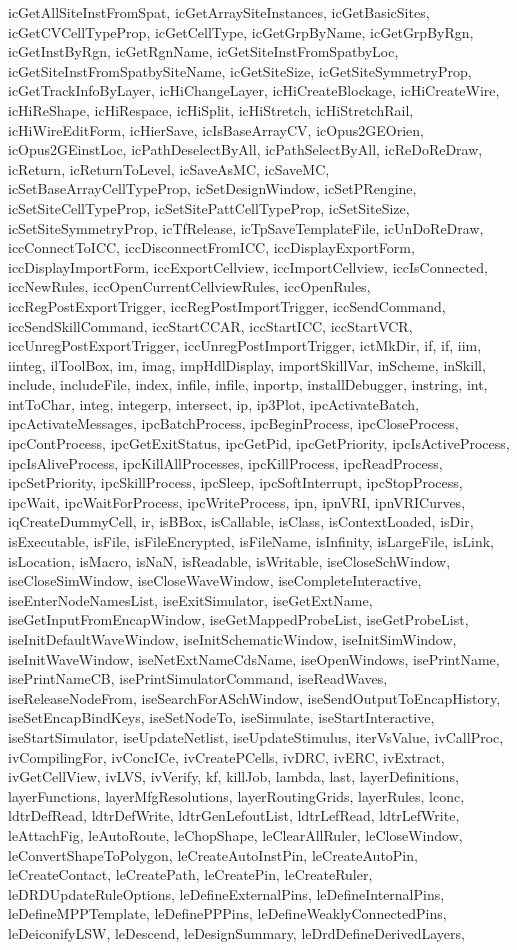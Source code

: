 {{icGetAllSiteInstFromSpat, icGetArraySiteInstances, icGetBasicSites, icGetCVCellTypeProp, icGetCellType, icGetGrpByName, icGetGrpByRgn, icGetInstByRgn, icGetRgnName, icGetSiteInstFromSpatbyLoc, icGetSiteInstFromSpatbySiteName, icGetSiteSize, icGetSiteSymmetryProp, icGetTrackInfoByLayer, icHiChangeLayer, icHiCreateBlockage, icHiCreateWire, icHiReShape, icHiRespace, icHiSplit, icHiStretch, icHiStretchRail, icHiWireEditForm, icHierSave, icIsBaseArrayCV, icOpus2GEOrien, icOpus2GEinstLoc, icPathDeselectByAll, icPathSelectByAll, icReDoReDraw, icReturn, icReturnToLevel, icSaveAsMC, icSaveMC, icSetBaseArrayCellTypeProp, icSetDesignWindow, icSetPRengine, icSetSiteCellTypeProp, icSetSitePattCellTypeProp, icSetSiteSize, icSetSiteSymmetryProp, icTfRelease, icTpSaveTemplateFile, icUnDoReDraw, iccConnectToICC, iccDisconnectFromICC, iccDisplayExportForm, iccDisplayImportForm, iccExportCellview, iccImportCellview, iccIsConnected, iccNewRules, iccOpenCurrentCellviewRules, iccOpenRules, iccRegPostExportTrigger, iccRegPostImportTrigger, iccSendCommand, iccSendSkillCommand, iccStartCCAR, iccStartICC, iccStartVCR, iccUnregPostExportTrigger, iccUnregPostImportTrigger, ictMkDir, if, if, iim, iinteg, ilToolBox, im, imag, impHdlDisplay, importSkillVar, inScheme, inSkill, include, includeFile, index, infile, infile, inportp, installDebugger, instring, int, intToChar, integ, integerp, intersect, ip, ip3Plot, ipcActivateBatch, ipcActivateMessages, ipcBatchProcess, ipcBeginProcess, ipcCloseProcess, ipcContProcess, ipcGetExitStatus, ipcGetPid, ipcGetPriority, ipcIsActiveProcess, ipcIsAliveProcess, ipcKillAllProcesses, ipcKillProcess, ipcReadProcess, ipcSetPriority, ipcSkillProcess, ipcSleep, ipcSoftInterrupt, ipcStopProcess, ipcWait, ipcWaitForProcess, ipcWriteProcess, ipn, ipnVRI, ipnVRICurves, iqCreateDummyCell, ir, isBBox, isCallable, isClass, isContextLoaded, isDir, isExecutable, isFile, isFileEncrypted, isFileName, isInfinity, isLargeFile, isLink, isLocation, isMacro, isNaN, isReadable, isWritable, iseCloseSchWindow, iseCloseSimWindow, iseCloseWaveWindow, iseCompleteInteractive, iseEnterNodeNamesList, iseExitSimulator, iseGetExtName, iseGetInputFromEncapWindow, iseGetMappedProbeList, iseGetProbeList, iseInitDefaultWaveWindow, iseInitSchematicWindow, iseInitSimWindow, iseInitWaveWindow, iseNetExtNameCdsName, iseOpenWindows, isePrintName, isePrintNameCB, isePrintSimulatorCommand, iseReadWaves, iseReleaseNodeFrom, iseSearchForASchWindow, iseSendOutputToEncapHistory, iseSetEncapBindKeys, iseSetNodeTo, iseSimulate, iseStartInteractive, iseStartSimulator, iseUpdateNetlist, iseUpdateStimulus, iterVsValue, ivCallProc, ivCompilingFor, ivConcICe, ivCreatePCells, ivDRC, ivERC, ivExtract, ivGetCellView, ivLVS, ivVerify, kf, killJob, lambda, last, layerDefinitions, layerFunctions, layerMfgResolutions, layerRoutingGrids, layerRules, lconc, ldtrDefRead, ldtrDefWrite, ldtrGenLefoutList, ldtrLefRead, ldtrLefWrite, leAttachFig, leAutoRoute, leChopShape, leClearAllRuler, leCloseWindow, leConvertShapeToPolygon, leCreateAutoInstPin, leCreateAutoPin, leCreateContact, leCreatePath, leCreatePin, leCreateRuler, leDRDUpdateRuleOptions, leDefineExternalPins, leDefineInternalPins, leDefineMPPTemplate, leDefinePPPins, leDefineWeaklyConnectedPins, leDeiconifyLSW, leDescend, leDesignSummary, leDrdDefineDerivedLayers, }}
